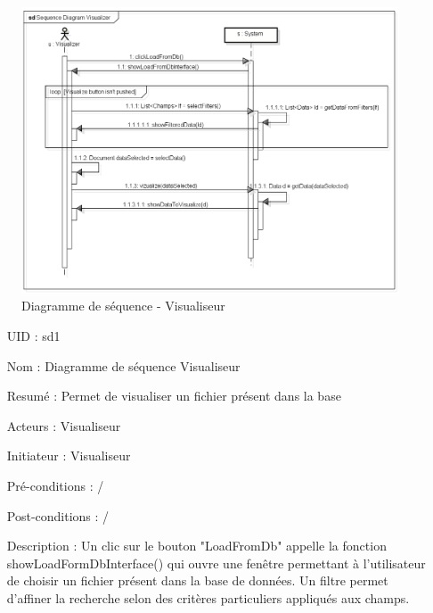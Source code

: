  
\begin{figure}[h]
	\begin{center}
		\includegraphics[scale = 0.4]{img/SeqDiagVisualizer.png}
	\end{center}
	\caption{Diagramme de séquence - Visualiseur}
	\label{seqDiagVisualizer}
\end{figure}

\begin{enumerate}[label=\bfseries]
	\item[{UID :}] sd1
	\item[{Nom :}] Diagramme de séquence Visualiseur
	\item[{Resumé :}]  Permet de visualiser un fichier présent dans la base
	\item[{Acteurs :}] Visualiseur
	\item[{Initiateur :}] Visualiseur
	\item[{Pré-conditions :}]  /
	\item[{Post-conditions :}]  /
	\item[{Description :}]
	Un clic sur le bouton "LoadFromDb" appelle la fonction showLoadFormDbInterface() qui ouvre une fenêtre permettant à l'utilisateur de choisir un fichier présent dans la base de données. Un filtre permet d'affiner la recherche selon des critères particuliers appliqués aux champs.
\end{enumerate}

